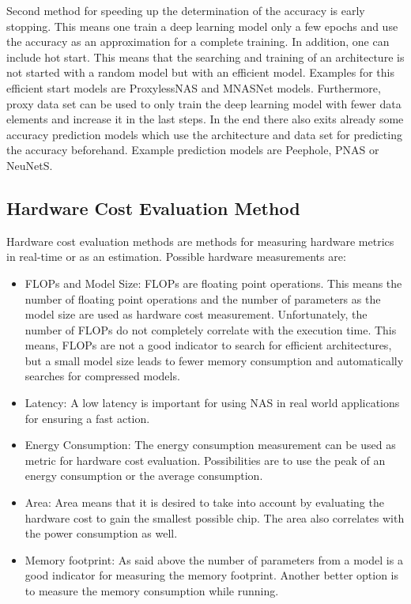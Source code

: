 \documentclass[conference]{IEEEtran}
\begin{document}
Second method for speeding up the determination of the accuracy is early stopping. This means one train a deep learning model only a few epochs and use the accuracy as an approximation for a complete training. In addition, one can include hot start. This means that the searching and training of an architecture is not started with a random model but with an efficient model. Examples for this efficient start models are ProxylessNAS and MNASNet models. Furthermore, proxy data set can be used to only train the deep learning model with fewer data elements and increase it in the last steps. In the end there also exits already some accuracy prediction models which use the architecture and data set for predicting the accuracy beforehand. Example prediction models are Peephole, PNAS or NeuNetS. 

\subsection{Hardware Cost Evaluation Method}
Hardware cost evaluation methods are methods for measuring hardware metrics in real-time or as an estimation. Possible hardware measurements are: 

\begin{itemize}
\item FLOPs and Model Size: FLOPs are floating point operations. This means the number of floating point operations and the number of parameters as the model size are used as hardware cost measurement. Unfortunately, the number of FLOPs do not completely correlate with the execution time. This means, FLOPs are not a good indicator to search for efficient architectures, but a small model size leads to fewer memory consumption and automatically searches for compressed models. 
\item Latency: A low latency is important for using NAS in real world applications for ensuring a fast action. 
\item Energy Consumption: The energy consumption measurement can be used as metric for hardware cost evaluation. Possibilities are to use the peak of an energy consumption or the average consumption.
\item Area: Area means that it is desired to take into account by evaluating the hardware cost to gain the smallest possible chip. The area also correlates with the power consumption as well.
\item Memory footprint: As said above the number of parameters from a model is a good indicator for measuring the memory footprint. Another better option is to measure the memory consumption while running.     
\end{itemize}
\end{document}
